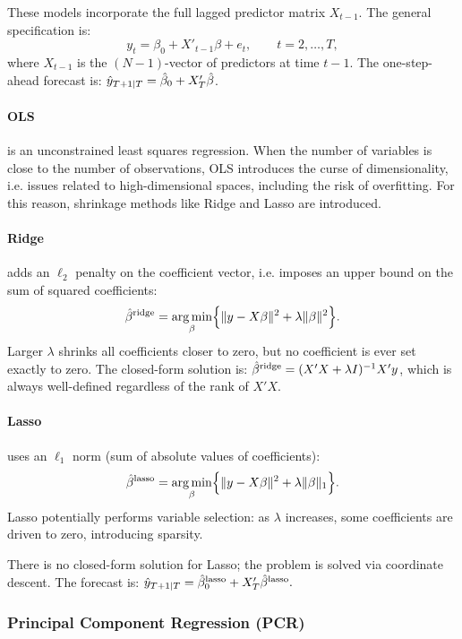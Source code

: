 \documentclass[12pt, a4paper]{article}
\begin{document}
These models incorporate the full lagged predictor matrix $X_{t-1}$. The general specification is:
\[
    y_t = \beta_0 + X'_{t-1}\beta + e_t, \qquad t = 2,\ldots,T,
\]
where $X_{t-1}$ is the $(N-1)$-vector of predictors at time $t-1$. The one-step-ahead forecast is:  $\small \hat{y}_{T+1|T} = \hat{\beta}_0 + X'_T\hat{\beta}$.

\paragraph{OLS}
is an unconstrained least squares regression. When the number of variables is close to the number of observations, OLS introduces the curse of dimensionality, i.e. issues related to high-dimensional spaces, including the risk of overfitting. For this reason, shrinkage methods like Ridge and Lasso are introduced.

\paragraph{Ridge} adds an $\ell_2$ penalty on the coefficient vector, i.e. imposes an upper bound on the sum of squared coefficients:
\[
    \hat{\beta}^{\text{ridge}} = \operatorname*{arg\,min}_\beta \Bigl\{ \|y - X\beta\|^2 + \lambda\|\beta\|^2 \Bigr\}.
\]
Larger $\lambda$ shrinks all coefficients closer to zero, but no coefficient is ever set exactly to zero.
The closed-form solution is:  $\small \hat{\beta}^{\text{ridge}} = (X'X + \lambda I)^{-1}X'y$, which is always well-defined regardless of the rank of $X'X$.

\paragraph{Lasso} uses an $\ell_1$ norm (sum of absolute values of coefficients):
\[
    \hat{\beta}^{\text{lasso}} = \operatorname*{arg\,min}_\beta \Bigl\{ \|y - X\beta\|^2 + \lambda\|\beta\|_1 \Bigr\}.
\]
Lasso potentially performs variable selection: as  $\lambda$ increases, some coefficients are driven to zero, introducing sparsity.

There is no closed-form solution for Lasso; the problem is solved via coordinate descent. The forecast is:  $\small \hat{y}_{T+1|T} = \hat{\beta}^{\text{lasso}}_0 + X'_T\hat{\beta}^{\text{lasso}}.$

\subsubsection*{Principal Component Regression (PCR)}
\end{document}

